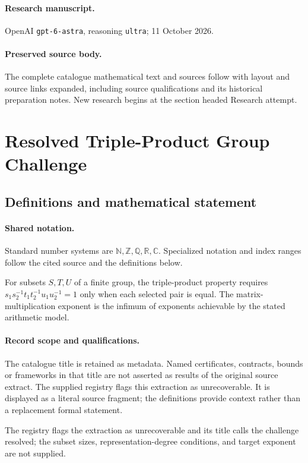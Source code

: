 \documentclass[11pt]{article}
\begin{document}
\paragraph{Research manuscript.} OpenAI \texttt{gpt-6-astra}, reasoning \texttt{ultra}; 11 October 2026.
\paragraph{Preserved source body.} The complete catalogue mathematical text and sources follow with layout and source links expanded, including source qualifications and its historical preparation notes. New research begins at the section headed Research attempt.

\section{Resolved Triple-Product Group Challenge}\label{statement}

\subsection{Definitions and mathematical statement}

\paragraph{Shared notation.}Standard number systems are $\mathbb N,\mathbb Z,\mathbb Q,\mathbb R,\mathbb C$. Specialized notation and index ranges follow the cited source and the definitions below.


For subsets $S,T,U$ of a finite group, the triple-product property requires $s_1s_2^{-1}t_1t_2^{-1}u_1u_2^{-1}=1$ only when each selected pair is equal. The matrix-multiplication exponent is the infimum of exponents achievable by the stated arithmetic model.
\paragraph{Record scope and qualifications.}
The catalogue title is retained as metadata. Named certificates, contracts, bounds or frameworks in that title are not asserted as results of the original source extract.
The supplied registry flags this extraction as unrecoverable. It is displayed as a literal source fragment; the definitions provide context rather than a replacement formal statement.

The registry flags the extraction as unrecoverable and its title calls the challenge resolved; the subset sizes, representation-degree conditions, and target exponent are not supplied.
\end{document}
